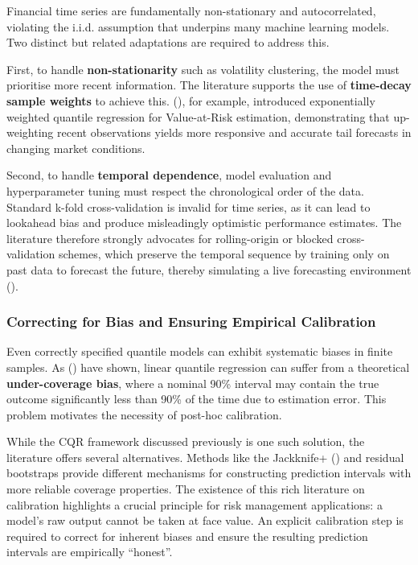 \documentclass[
  a4paper,
  DIV=11,
  numbers=noendperiod]{scrreprt}
\begin{document}
Financial time series are fundamentally non-stationary and
autocorrelated, violating the i.i.d. assumption that underpins many
machine learning models. Two distinct but related adaptations are
required to address this.

First, to handle \textbf{non-stationarity} such as volatility
clustering, the model must prioritise more recent information. The
literature supports the use of \textbf{time-decay sample weights} to
achieve this. (), for example,
introduced exponentially weighted quantile regression for Value-at-Risk
estimation, demonstrating that up-weighting recent observations yields
more responsive and accurate tail forecasts in changing market
conditions.

Second, to handle \textbf{temporal dependence}, model evaluation and
hyperparameter tuning must respect the chronological order of the data.
Standard k-fold cross-validation is invalid for time series, as it can
lead to lookahead bias and produce misleadingly optimistic performance
estimates. The literature therefore strongly advocates for
rolling-origin or blocked cross-validation schemes, which preserve the
temporal sequence by training only on past data to forecast the future,
thereby simulating a live forecasting environment
().

\subsubsection{Correcting for Bias and Ensuring Empirical
Calibration}\label{correcting-for-bias-and-ensuring-empirical-calibration}

Even correctly specified quantile models can exhibit systematic biases
in finite samples. As ()
have shown, linear quantile regression can suffer from a theoretical
\textbf{under-coverage bias}, where a nominal 90\% interval may contain
the true outcome significantly less than 90\% of the time due to
estimation error. This problem motivates the necessity of post-hoc
calibration.

While the CQR framework discussed previously is one such solution, the
literature offers several alternatives. Methods like the Jackknife+
() and residual
bootstraps provide different mechanisms for constructing prediction
intervals with more reliable coverage properties. The existence of this
rich literature on calibration highlights a crucial principle for risk
management applications: a model's raw output cannot be taken at face
value. An explicit calibration step is required to correct for inherent
biases and ensure the resulting prediction intervals are empirically
``honest''.
\end{document}
